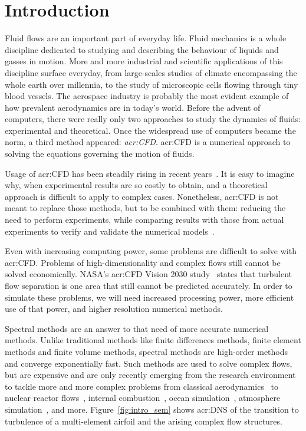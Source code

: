 \chapter{Introduction}

Fluid flows are an important part of everyday life. Fluid mechanics is a whole discipline dedicated
to studying and describing the behaviour of liquids and gasses in motion. More and more industrial
and scientific applications of this discipline surface everyday, from large-scales studies of
climate encompassing the whole earth over millennia, to the study of microscopic cells flowing
through tiny blood vessels. The aerospace industry is probably the most evident example of how
prevalent aerodynamics are in today's world. Before the advent of computers, there were really only
two approaches to study the dynamics of fluids: experimental and theoretical. Once the widespread
use of computers became the norm, a third method appeared: \textit{\acrfull{acr:CFD}}.
\Acrshort{acr:CFD} is a numerical approach to solving the equations governing the motion of fluids.

Usage of \acrshort{acr:CFD} has been steadily rising in recent years~\cite{Slotnick2014}. It is easy
to imagine why, when experimental results are so costly to obtain, and a theoretical approach is
difficult to apply to complex cases. Nonetheless, \acrshort{acr:CFD} is not meant to replace those
methods, but to be combined with them: reducing the need to perform experiments, while comparing
results with those from actual experiments to verify and validate the numerical
models~\cite{Stern2001}.

Even with increasing computing power, some problems are difficult to solve with \acrshort{acr:CFD}.
Problems of high-dimensionality and complex flows still cannot be solved economically. NASA's
\acrshort{acr:CFD} Vision 2030 study~\cite{Slotnick2014} states that turbulent flow separation is
one area that still cannot be predicted accurately. In order to simulate these problems, we will
need increased processing power, more efficient use of that power, and higher resolution numerical
methods.

Spectral methods are an answer to that need of more accurate numerical methods. Unlike traditional
methods like finite differences methods, finite element methods and finite volume methods, spectral
methods are high-order methods and converge exponentially fast. Such methods are used to solve
complex flows, but are expensive and are only recently emerging from the research environment to
tackle more and more complex problems from classical aerodynamics~\cite{Vadsola2021} to nuclear
reactor flows~\cite{Merzari2017}, internal combustion~\cite{Wu2021}, ocean
simulation~\cite{Molcard2002}, atmosphere simulation~\cite{Haidvogel1997}, and more.
Figure~\ref{fig:intro_sem} shows \acrfull{acr:DNS} of the transition to turbulence of a
multi-element airfoil and the arising complex flow structures.

